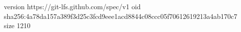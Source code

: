 version https://git-lfs.github.com/spec/v1
oid sha256:4a78da157a389f3d25c3fcd9eee1acd8844c08ccc05f70612619213a4ab170c7
size 1210
